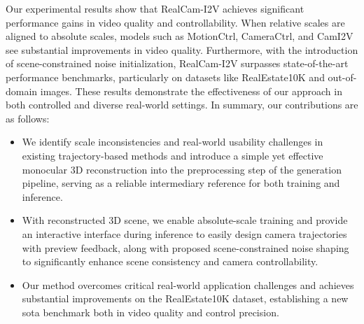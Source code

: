 Our experimental results show that RealCam-I2V achieves significant performance gains in video quality and controllability. When relative scales are aligned to absolute scales, models such as MotionCtrl, CameraCtrl, and CamI2V see substantial improvements in video quality. Furthermore, with the introduction of scene-constrained noise initialization, RealCam-I2V surpasses state-of-the-art performance benchmarks, particularly on datasets like RealEstate10K \cite{zhou2018stereo} and out-of-domain images. These results demonstrate the effectiveness of our approach in both controlled and diverse real-world settings.
In summary, our contributions are as follows:
\begin{itemize}
    \item We identify scale inconsistencies and real-world usability challenges in existing trajectory-based methods and introduce a simple yet effective monocular 3D reconstruction into the preprocessing step of the generation pipeline, serving as a reliable intermediary reference for both training and inference.
    \item  With reconstructed 3D scene, we enable absolute-scale training and provide an interactive interface during inference to easily design camera trajectories with preview feedback, along with proposed scene-constrained noise shaping to significantly enhance scene consistency and camera controllability.
    \item Our method overcomes critical real-world application challenges and achieves substantial improvements on the RealEstate10K dataset, establishing a new sota benchmark both in video quality and control precision.
\end{itemize}
    

